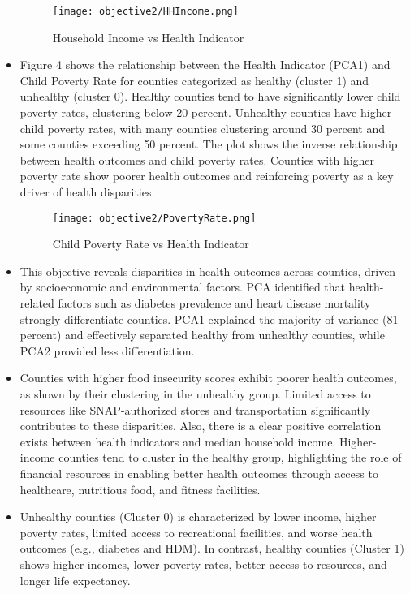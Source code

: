 \documentclass{article}
\begin{document}
\begin{itemize}[leftmargin=0pt]
\begin{figure}[h]
    \centering
    \texttt{[image: objective2/HHIncome.png]}
    \caption{Household Income vs Health Indicator}
    \label{fig:income}
\end{figure}


\item[]
Figure 4 shows the relationship between the Health Indicator (PCA1) and Child Poverty Rate for counties categorized as healthy (cluster 1) and unhealthy (cluster 0). Healthy counties tend to have significantly lower child poverty rates, clustering below 20 percent. Unhealthy counties have higher child poverty rates, with many counties clustering around 30 percent and some counties exceeding 50 percent. The plot shows the inverse relationship between health outcomes and child poverty rates. Counties with higher poverty rate show poorer health outcomes and reinforcing poverty as a key driver of health disparities.

\begin{figure}[h]
    \centering
    \texttt{[image: objective2/PovertyRate.png]}
    \caption{Child Poverty Rate vs Health Indicator}
    \label{fig:povertyrate}
\end{figure}

\item[]
This objective reveals disparities in health outcomes across counties, driven by socioeconomic and environmental factors. PCA identified that health-related factors such as diabetes prevalence and heart disease mortality strongly differentiate counties. PCA1 explained the majority of variance (81 percent) and effectively separated healthy from unhealthy counties, while PCA2 provided less differentiation.
\item[]
Counties with higher food insecurity scores exhibit poorer health outcomes, as shown by their clustering in the unhealthy group. Limited access to resources like SNAP-authorized stores and transportation significantly contributes to these disparities. Also, there is a clear positive correlation exists between health indicators and median household income. Higher-income counties tend to cluster in the healthy group, highlighting the role of financial resources in enabling better health outcomes through access to healthcare, nutritious food, and fitness facilities. 
\item[]
Unhealthy counties (Cluster 0) is characterized by lower income, higher poverty rates, limited access to recreational facilities, and worse health outcomes (e.g., diabetes and HDM). In contrast, healthy counties (Cluster 1) shows higher incomes, lower poverty rates, better access to resources, and longer life expectancy.


\end{itemize}
\end{document}

